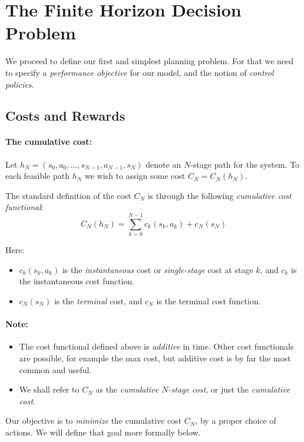 \section{The Finite Horizon Decision Problem}

We proceed to define our first and simplest planning problem. For that we need to specify a \emph{performance objective} for our model, and the notion of \emph{control policies}.

\subsection{Costs and Rewards}

\paragraph{The cumulative cost:}  Let ${h_N} = ({s_0},{a_0}, \ldots ,{s_{N - 1}},{a_{N - 1}},{s_N})$ denote an $N$-stage path for the system. To each feasible path ${h_N}$ we wish to assign some cost ${C_N} = {C_N}({h_N})$.

The standard definition of the cost ${C_N}$ is through the following \emph{cumulative cost functional}:
\[{C_N}({h_N}) = \sum\limits_{k = 0}^{N - 1} {{c_k}({s_k},{a_k}) + {c_N}({s_N})} \]

Here:
 	\begin{itemize}
    \item ${c_k}({s_k},{a_k})$ is the \emph{instantaneous}  cost or \emph{single-stage }cost at stage $k$, and ${c_k}$ is the instantaneous cost function.
    \item ${c_N}({s_N})$ is the \emph{terminal} cost, and ${c_N}$ is the terminal cost function.
  \end{itemize}

\paragraph{Note:}
\begin{itemize}
  \item The cost functional defined above is \emph{additive} in time. Other cost functionals are possible, for example the max cost, but additive cost is by far the most common and useful.
  \item We shall refer to ${C_N}$ as the \emph{cumulative $N$-stage cost}, or just the \emph{cumulative cost}.
\end{itemize}

Our objective is to \emph{minimize} the cumulative cost ${C_N}$, by a proper choice of actions. We will define that goal more formally below.

